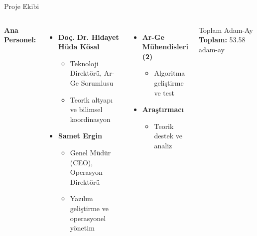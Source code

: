 \documentclass[aspectratio=169,xcolor={dvipsnames}]{beamer}
\begin{document}
\begin{frame}{Proje Ekibi}
\begin{columns}[t] %

\textbf{Ana Personel:}
\begin{itemize}
\item \textbf{Doç. Dr. Hidayet Hüda Kösal}
    \begin{itemize}
    \item Teknoloji Direktörü, Ar-Ge Sorumlusu
    \item Teorik altyapı ve bilimsel koordinasyon
    \end{itemize}

\vspace{0.5cm} %

\item \textbf{Samet Ergin}
    \begin{itemize}
    \item Genel Müdür (CEO), Operasyon Direktörü
    \item Yazılım geliştirme ve operasyonel yönetim
    \end{itemize}
\end{itemize}

\begin{itemize}
\item \textbf{Ar-Ge Mühendisleri (2)}
    \begin{itemize}
    \item Algoritma geliştirme ve test
    \end{itemize}

\vspace{0.5cm} %

\item \textbf{Araştırmacı}
    \begin{itemize}
    \item Teorik destek ve analiz
    \end{itemize}
\end{itemize}

\vfill %

\begin{block}{Toplam Adam-Ay}
\textbf{Toplam:} 53.58 adam-ay
\end{block}

\end{columns}
\end{frame}
\end{document}
